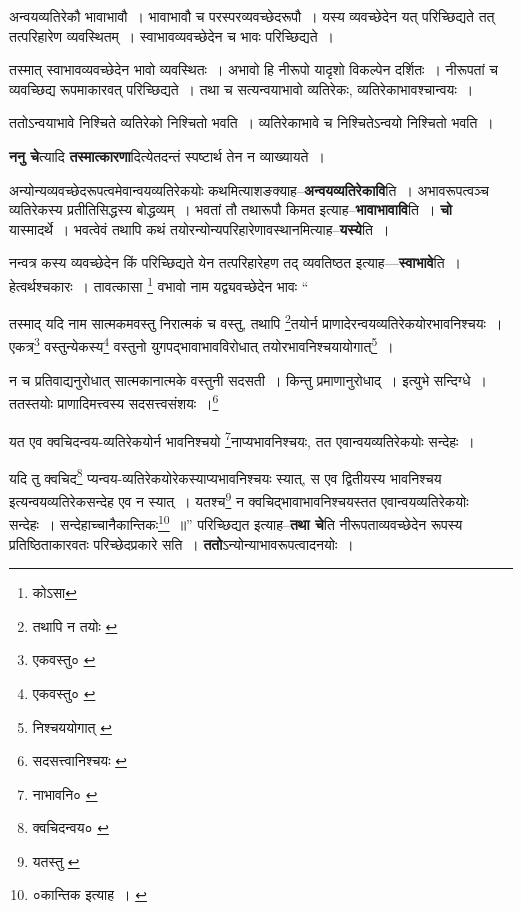 \documentclass[article,12pt,a4paper]{memoir}
\begin{document}
	  \pstart अन्वयव्यतिरेकौ भावाभावौ । भावाभावौ च परस्परव्यवच्छेदरूपौ । यस्य व्यवच्छेदेन यत् परिच्छिद्यते तत् तत्परिहारेण व्यवस्थितम् । स्वाभावव्यवच्छेदेन च भावः परिच्छिद्यते ।
	\pend
       

	  \pstart तस्मात् स्वाभावव्यवच्छेदेन भावो व्यवस्थितः । अभावो हि नीरूपो यादृशो विकल्पेन दर्शितः । नीरूपतां च व्यवच्छिद्य रूपमाकारवत् परिच्छिद्यते । तथा च सत्यन्वयाभावो व्यतिरेकः, व्यतिरेकाभावश्चान्वयः ।
	\pend
       

	  \pstart ततोऽन्वयाभावे निश्चिते व्यतिरेको निश्चितो भवति । व्यतिरेकाभावे च निश्चितेऽन्वयो निश्चितो भवति ।
	\pend
      
	  \endgroup
	

	  \pstart \textbf{ननु चे}त्यादि \textbf{तस्मात्कारणा}दित्येतदन्तं स्पष्टार्थ तेन न व्याख्यायते ।
	\pend
      

	  \pstart अन्योन्यव्यवच्छेदरूपत्वमेवान्वयव्यतिरेकयोः कथमित्याशङक्याह--\textbf{अन्वयव्यतिरेकावि}ति । अभावरूपत्वञ्च व्यतिरेकस्य प्रतीतिसिद्धस्य बोद्धव्यम् । भवतां तौ तथारूपौ किमत इत्याह--\textbf{भावाभावावि}ति । \textbf{चो} यास्मादर्थे । भवत्वेवं तथापि कथं तयोरन्योन्यपरिहारेणावस्थानमित्याह--\textbf{यस्ये}ति ।
	\pend
      

	  \pstart नन्वत्र कस्य व्यवच्छेदेन किं परिच्छिद्यते येन तत्परिहारेहण तद् व्यवतिष्ठत इत्याह—\textbf{स्वाभावे}ति । हेत्वर्थश्चकारः । तावत्कासा \footnote{कोऽसा} वभावो नाम यद्व्यवच्छेदेन भावः  \leavevmode{} “
	  
	तस्माद् यदि नाम सात्मकमवस्तु निरात्मकं च वस्तु, तथापि \footnote{तथापि न तयोः \cite{dp-msA} \cite{dp-msB} \cite{dp-edP} \cite{dp-edH} \cite{dp-edE} \cite{dp-edN}}\-तयोर्न प्राणादेरन्वयव्यतिरेकयोरभावनिश्चयः । एकत्र\footnote{एकवस्तु० \cite{dp-msA} \cite{dp-msB} \cite{dp-edP} \cite{dp-edH} \cite{dp-edE} \cite{dp-edN}} वस्तुन्येकस्य\footnote{एकवस्तु० \cite{dp-msA} \cite{dp-msB} \cite{dp-edP} \cite{dp-edH} \cite{dp-edE} \cite{dp-edN}} वस्तुनो युगपद्भावाभावविरोधात् तयोरभावनिश्चयायोगात्\footnote{निश्चययोगात् \cite{dp-msB}} । 
	  
	न च प्रतिवाद्यनुरोधात् सात्मकानात्मके वस्तुनी सदसती । किन्तु प्रमाणानुरोधाद् । इत्युभे सन्दिग्धे । ततस्तयोः प्राणादिमत्त्वस्य सदसत्त्वसंशयः ।\footnote{सदसत्त्वानिश्चयः \cite{dp-msC}} 
	  
	यत एव क्वचिदन्वय-व्यतिरेकयोर्न भावनिश्चयो \footnote{नाभावनि० \cite{dp-msC}}\-नाप्यभावनिश्चयः, तत एवान्वयव्यतिरेकयोः सन्देहः । 
	  
	यदि तु क्वचिद\footnote{क्वचिदन्वय० \cite{dp-msC} \cite{dp-msD}} प्यन्वय-व्यतिरेकयोरेकस्याप्यभावनिश्चयः स्यात्, स एव द्वितीयस्य भावनिश्चय इत्यन्वयव्यतिरेकसन्देह एव न स्यात् । यतश्च\footnote{यतस्तु \cite{dp-msC} \cite{dp-msD}} न क्वचिद्भावाभावनिश्चयस्तत एवान्वयव्यतिरेकयोः सन्देहः । सन्देहाच्चानैकान्तिकः\footnote{०कान्तिक इत्याह । \cite{dp-edE}} ॥” परिच्छिद्यत इत्याह--\textbf{तथा चे}ति नीरूपताव्यवच्छेदेन रूपस्य प्रतिष्ठिताकारवतः परिच्छेदप्रकारे सति । \textbf{ततो}ऽन्योन्याभावरूपत्वादनयोः ।
	\pend
      
\end{document}
